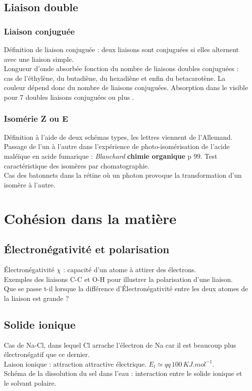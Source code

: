 \documentclass[12pt,prb,aps,epsf]{article}
\begin{document}
\subsection{Liaison double}
\subsubsection{Liaison conjuguée}
	Définition de liaison conjuguée : deux liaisons sont conjuguées si elles alternent avec une liaison simple.\\
	Longueur d'onde absorbée fonction du nombre de liaisons doubles conjuguées : cas de l'éthylène, du butadiène, du hexadiène et enfin du betacarotène. La couleur dépend donc du nombre de liaisons conjuguées. Absorption dans le visible pour 7 doubles liaisons conjuguées ou plus .
	
\subsubsection{Isomérie Z ou E}
	Définition à l'aide de deux schémas types, les lettres viennent de l'Allemand.\\
	Passage de l'un à l'autre dans l'expérience  de photo-isomérisation de l'acide maléïque en acide fumarique : \textit{Blanchard} \textbf{chimie organique} p 99. Test caractéristique des isomères par chomatographie.\\
	
	Cas des batonnets dans la rétine où un photon provoque la transformation d'un isomère à l'autre.	
	
\section{Cohésion dans la matière}

\subsection{Électronégativité et polarisation}
	Électronégativité $\chi$ : capacité d'un atome à attirer des électrons.\\
	Exemples des liaisons C-C et O-H pour illustrer la polarisation d'une liaison.\\
	Que se passe t-il lorsque la différence d'Électronégativité entre les deux atomes de la liaison est grande ?
	
\subsection{Solide ionique}
	Cas de Na-Cl, dans lequel Cl arrache l'électron de Na car il est beaucoup plus électronégatif que ce dernier.\\
	Laison ionique : attraction attractive électrique. $E_l \simeq qq\, 100\,KJ.mol^{-1}$.\\
	Schéma de la dissolution du sel dans l'eau : interaction entre le solide ionique et le solvant polaire.
	
\end{document}
